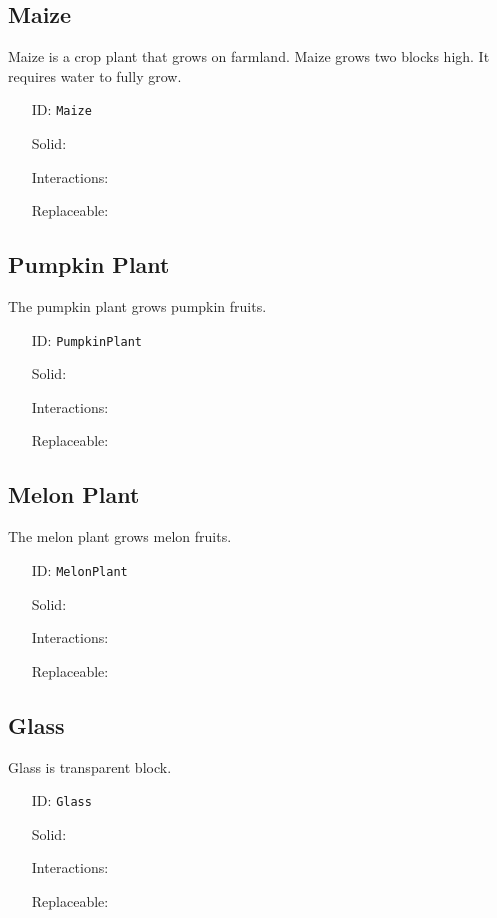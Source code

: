 \subsection{Maize}\label{subsec:blocks_maize}
Maize is a crop plant that grows on farmland.
Maize grows two blocks high. It requires water to fully grow.
\newline
\begin{itemize}[nosep]
    \item[ID:] \texttt{Maize}
    \item[Solid:]  \XSolidBrush \item[Interactions:]  \XSolidBrush \item[Replaceable:]  \XSolidBrush
\end{itemize}

\subsection{Pumpkin Plant}\label{subsec:blocks_pumpkin plant}
The pumpkin plant grows pumpkin fruits.
\newline
\begin{itemize}[nosep]
    \item[ID:] \texttt{PumpkinPlant}
    \item[Solid:]  \XSolidBrush \item[Interactions:]  \XSolidBrush \item[Replaceable:]  \XSolidBrush
\end{itemize}

\subsection{Melon Plant}\label{subsec:blocks_melon plant}
The melon plant grows melon fruits.
\newline
\begin{itemize}[nosep]
    \item[ID:] \texttt{MelonPlant}
    \item[Solid:]  \XSolidBrush \item[Interactions:]  \XSolidBrush \item[Replaceable:]  \XSolidBrush
\end{itemize}

\subsection{Glass}\label{subsec:blocks_glass}
Glass is transparent block.
\newline
\begin{itemize}[nosep]
    \item[ID:] \texttt{Glass}
    \item[Solid:]  \Checkmark \item[Interactions:]  \XSolidBrush \item[Replaceable:]  \XSolidBrush
\end{itemize}

